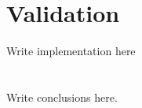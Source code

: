\documentclass[12pt,a4paper,openright,twoside]{book}
\begin{document}
\chapter{Validation} %
\label{chap:validation}

Write implementation here

\chapter{\conclusionsname}
\label{chap:conclusions}

Write conclusions here.



\nocite{*} %


\end{document}
